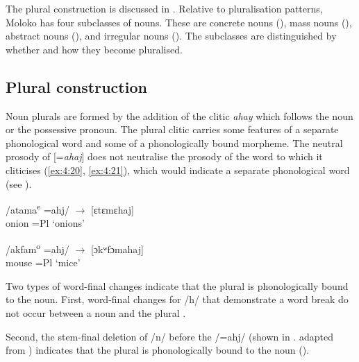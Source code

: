 The plural construction is discussed in . Relative to pluralisation patterns, Moloko has four subclasses of nouns. These are concrete nouns (), mass nouns (), abstract nouns (), and irregular nouns (). The subclasses are distinguished by whether and how they become pluralised. 

\subsection{Plural construction}\label{sec:4.2.2}
\hypertarget{RefHeading1211421525720847}{}
Noun plurals are formed by the addition of the clitic \textit{ahay} which follows the noun or the possessive pronoun. The plural clitic carries some features of a separate phonological word and some of a phonologically bound morpheme. The neutral prosody of [=\textit{ahaj}] does not neutralise the prosody of the word to which it cliticises (\ref{ex:4:20}, \ref{ex:4:21}), which would indicate a separate phonological word (see ). 


\ea \label{ex:4:20}
 \textup{/atama\textsuperscript{e}} \textup{=ahj/  \hspace{20pt}  $\rightarrow$ \hspace{10pt}  [ɛtɛmɛhaj]}\\
  onion \hspace{8pt}    =Pl     \hspace{60pt}      ‘onions’\\
\z

\ea \label{ex:4:21}
\textup{/akfam\textsuperscript{o}} \textup{=ahj/} \hspace{15pt}   $\rightarrow$ \hspace{10pt} \textup{[}\textup{ɔkʷfɔmahaj]}\\
\glt  mouse \hspace{6pt}  =Pl  \hspace{60pt}      ‘mice’
\z

Two types of word-final changes indicate that the plural is phonologically bound to the noun. First, word-final changes for /h/ that demonstrate a word break do not occur between a noun and the plural . 

Second, the stem-final deletion of /n/ before the /=ahj/ (shown in . adapted from \citealt{Bow1997c}) indicates that the plural is phonologically bound to the noun (). 


